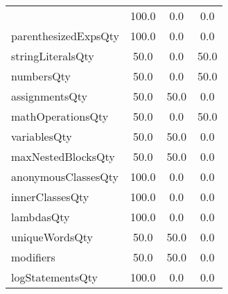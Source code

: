 \begin{tabular}{lccc}
{tryCatchQty & 100.0 & 0.0 & 0.0 \\
parenthesizedExpsQty & 100.0 & 0.0 & 0.0 \\
stringLiteralsQty & 50.0 & 0.0 & 50.0 \\
numbersQty & 50.0 & 0.0 & 50.0 \\
assignmentsQty & 50.0 & 50.0 & 0.0 \\
mathOperationsQty & 50.0 & 0.0 & 50.0 \\
variablesQty & 50.0 & 50.0 & 0.0 \\
maxNestedBlocksQty & 50.0 & 50.0 & 0.0 \\
anonymousClassesQty & 100.0 & 0.0 & 0.0 \\
innerClassesQty & 100.0 & 0.0 & 0.0 \\
lambdasQty & 100.0 & 0.0 & 0.0 \\
uniqueWordsQty & 50.0 & 50.0 & 0.0 \\
modifiers & 50.0 & 50.0 & 0.0 \\
logStatementsQty & 100.0 & 0.0 & 0.0 \\
\bottomrule
              \end{tabular}
            